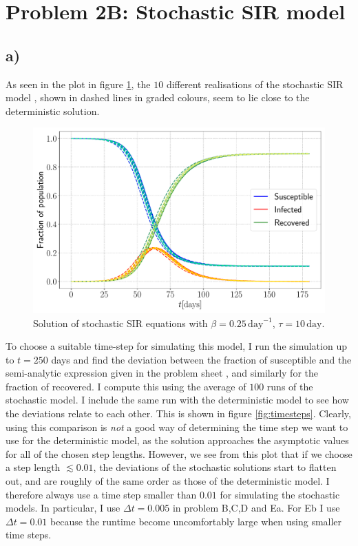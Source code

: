 \section{Problem 2B: Stochastic SIR model}

\subsection{a)}

As seen in the plot in figure \ref{fig:SIR_stoch}, the $10$ different realisations of the stochastic SIR model , shown in dashed lines in graded colours, seem to lie close to the deterministic solution.

\begin{figure}[htb]
	\centering
	\includegraphics[width=0.8\columnwidth]{../fig/2Ba_SIR.pdf}
	\caption{Solution of stochastic SIR equations with $\beta = 0.25\, \mathrm{day}^{-1}$, $\tau = 10\, \mathrm{day}$.}
	\label{fig:SIR_stoch}
\end{figure}

To choose a suitable time-step for simulating this model, I run the simulation up to $t = 250$ days and find the deviation between the fraction of susceptible and the semi-analytic expression given in the problem sheet \cite{sheet}, and similarly for the fraction of recovered. I compute this using the average of $100$ runs of the stochastic model. I include the same run with the deterministic model to see how the deviations relate to each other. This is shown in figure \ref{fig:timesteps}. Clearly, using this comparison is \textit{not} a good way of determining the time step we want to use for the deterministic model, as the solution approaches the asymptotic values for all of the chosen step lengths. However, we see from this plot that if we choose a step length $\lesssim 0.01$, the deviations of the stochastic solutions start to flatten out, and are roughly of the same order as those of the deterministic model. I therefore always use a time step smaller than $0.01$ for simulating the stochastic models. In particular, I use $\Delta t = 0.005$ in problem B,C,D and Ea. For Eb I use $\Delta t = 0.01$ because the runtime become uncomfortably large when using smaller time steps.

